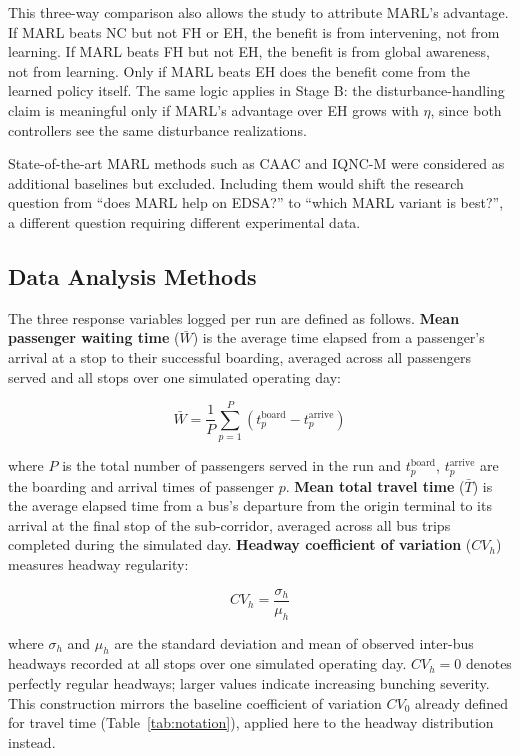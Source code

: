 This three-way comparison also allows the study to attribute MARL's advantage. If MARL beats NC but not FH or EH, the benefit is from intervening, not from learning. If MARL beats FH but not EH, the benefit is from global awareness, not from learning. Only if MARL beats EH does the benefit come from the learned policy itself. The same logic applies in Stage B: the disturbance-handling claim is meaningful only if MARL's advantage over EH grows with $\eta$, since both controllers see the same disturbance realizations.

State-of-the-art MARL methods such as CAAC and IQNC-M \cite{Wangsun} were considered as additional baselines but excluded. Including them would shift the research question from ``does MARL help on EDSA?'' to ``which MARL variant is best?'', a different question requiring different experimental data. 

\subsection{Data Analysis Methods}

The three response variables logged per run are defined as follows. \textbf{Mean passenger waiting time} ($\bar{W}$) is the average time elapsed from a passenger's arrival at a stop to their successful boarding, averaged across all passengers served and all stops over one simulated operating day:

\begin{equation}
\bar{W} = \frac{1}{P} \sum_{p=1}^{P} \left(t_p^{\text{board}} - t_p^{\text{arrive}}\right)
\label{eq:waiting_time}
\end{equation}

where $P$ is the total number of passengers served in the run and $t_p^{\text{board}}$, $t_p^{\text{arrive}}$ are the boarding and arrival times of passenger $p$. \textbf{Mean total travel time} ($\bar{T}$) is the average elapsed time from a bus's departure from the origin terminal to its arrival at the final stop of the sub-corridor, averaged across all bus trips completed during the simulated day. \textbf{Headway coefficient of variation} ($CV_h$) measures headway regularity:

\begin{equation}
CV_h = \frac{\sigma_h}{\mu_h}
\label{eq:headway_cv}
\end{equation}

where $\sigma_h$ and $\mu_h$ are the standard deviation and mean of observed inter-bus headways recorded at all stops over one simulated operating day. $CV_h = 0$ denotes perfectly regular headways; larger values indicate increasing bunching severity. This construction mirrors the baseline coefficient of variation $CV_0$ already defined for travel time (Table~\ref{tab:notation}), applied here to the headway distribution instead.

